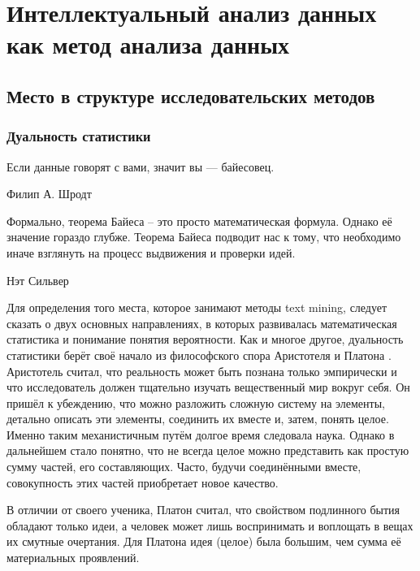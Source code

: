 \chapter{Интеллектуальный анализ данных как метод анализа данных} \label{chapt1}

\section{Место в структуре исследовательских методов} \label{sect1_1}

\subsection{Дуальность статистики}

\epigraph{Если данные говорят с вами, значит вы --- байесовец.}{Филип А. Шродт \cite[стр. 11]{Schrodt2010}}

\epigraph{Формально, теорема Байеса -- это просто математическая формула. Однако её значение гораздо глубже. Теорема Байеса подводит нас к тому, что необходимо иначе взглянуть на процесс выдвижения и проверки идей.}{Нэт Сильвер\footnotemark\cite{silver2012}}



Для определения того места, которое занимают методы text mining, следует сказать о двух основных направлениях, в которых развивалась математическая статистика и понимание понятия вероятности. Как и многое другое, дуальность статистики берёт своё начало из философского спора Аристотеля и Платона \cite[стр. 7]{handbook_stat_dm}. Аристотель считал, что реальность может быть познана только эмпирически и что исследователь должен тщательно изучать вещественный мир вокруг себя. Он пришёл к убеждению, что можно разложить сложную систему на элементы, детально описать эти элементы, соединить их вместе и, затем, понять целое. Именно таким механистичным путём долгое время следовала наука. Однако в дальнейшем стало понятно, что не всегда целое можно представить как простую сумму частей, его составляющих. Часто, будучи соединёнными вместе, совокупность этих частей приобретает новое качество.

В отличии от своего ученика, Платон считал, что свойством подлинного бытия обладают только идеи, а человек может лишь воспринимать и воплощать в вещах их смутные очертания. Для Платона идея (целое) была большим, чем сумма её материальных проявлений.

